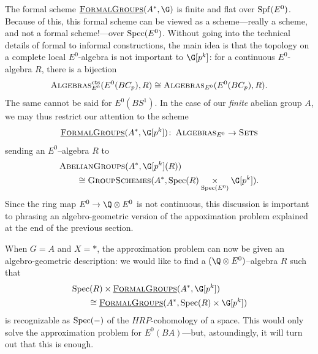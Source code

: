 The formal scheme \(\InternalHom{FormalGroups}(A^*,\G)\) is finite and flat over \(\operatorname{Spf}(E^0)\).
Because of this, this formal scheme can be viewed as a scheme---really a scheme, and not a formal scheme!---over \(\operatorname{Spec}(E^0)\).
Without going into the technical details of formal to informal constructions, the main idea is that the topology on a complete local \(E^0\)-algebra is not important to \(\G[p^k]\): for a continuous \(E^0\)-algebra \(R\), there is a bijection
\[
\normalfont\textsc{Algebras}_{E^0}^{\mathrm{cts}}(E^0(BC_p),R) \cong \normalfont\textsc{Algebras}_{E^0}(E^0(BC_p),R).
\]
The same cannot be said for \(E^0(BS^1)\).
In the case of our \emph{finite} abelian group $A$, we may thus restrict our attention to the scheme
\[
\InternalHom{FormalGroups}(A^*,\G[p^k]) \co \CatOf{Algebras}_{E^0} \rightarrow \CatOf{Sets}
\]
sending an \(E^0\)--algebra \(R\) to
\begin{align*}
& \CatOf{AbelianGroups}(A^*, \G[p^k](R)) \\
& \quad \quad \cong \CatOf{GroupSchemes}(A^*, \Spec(R) \underset{{\Spec(E^0)}}{\times} \G[p^k]).
\end{align*}
Since the ring map \(E^0 \rightarrow \Q \otimes E^0\) is not continuous, this discussion is important to phrasing an algebro-geometric version of the appoximation problem explained at the end of the previous section.

When \(G = A\) and \(X = *\), the approximation problem can now be given an algebro-geometric description: we would like to find a \((\Q \otimes E^0)\)--algebra \(R\) such that 
\begin{align*}
& \Spec(R) \times \InternalHom{FormalGroups}(A^*, \G[p^k]) \\
& \quad \quad \cong \InternalHom{FormalGroups}(A^*, \Spec(R) \times \G[p^k])
\end{align*}
is recognizable as \(\operatorname{Spec}(-)\) of the \(HRP\)-cohomology of a space.
This would only solve the approximation problem for \(E^0(BA)\)---but, astoundingly, it will turn out that this is enough.

